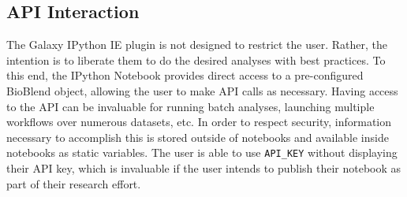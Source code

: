 \documentclass{bioinfo}
\begin{document}
\begin{methods}
\subsection{API Interaction}
The Galaxy IPython IE plugin is not designed to restrict the user. Rather, the intention is to liberate
them to do the desired analyses with best practices. To this end, the IPython Notebook provides direct access to a pre-configured
BioBlend object, allowing the user to make API calls as necessary. Having access to the API can be invaluable for running
batch analyses, launching multiple workflows over numerous datasets, etc. In order to respect security, information necessary
to accomplish this is stored outside of notebooks and available inside notebooks as static variables. The user is able to use
\texttt{API\_KEY} without displaying their API key, which is invaluable if the user intends to publish their notebook as
part of their research effort.

%
%
%
%
%
%
%
%
%
%


\end{methods}
\end{document}

